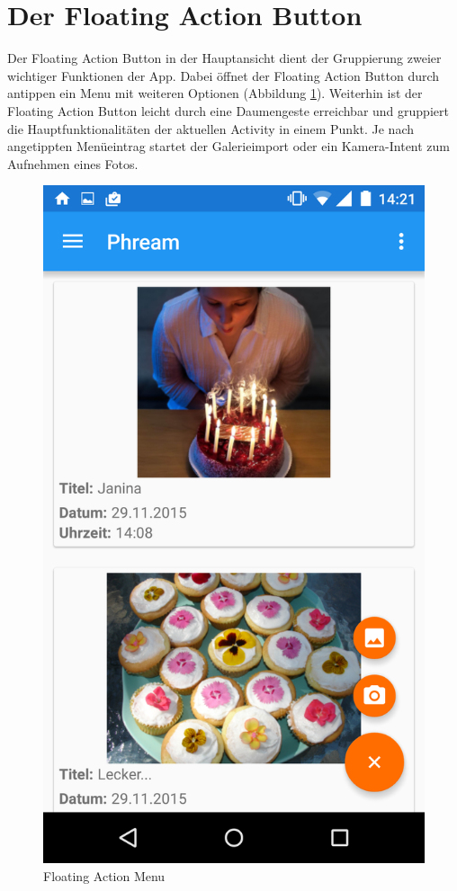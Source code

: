 \section{Der Floating Action Button}
Der Floating Action Button in der Hauptansicht dient der Gruppierung zweier wichtiger Funktionen der App. Dabei öffnet der Floating Action Button durch antippen ein Menu mit weiteren Optionen (Abbildung \ref{label:floatingaction_menu}). Weiterhin ist der Floating Action Button leicht durch eine Daumengeste erreichbar und gruppiert die Hauptfunktionalitäten der aktuellen Activity in einem Punkt. Je nach angetippten Menüeintrag startet der Galerieimport oder ein Kamera-Intent zum Aufnehmen eines Fotos.

\begin{figure}[H]
\centering
\includegraphics[scale=0.1]{images/screenshots/floatingaction_menu.png}
\caption{Floating Action Menu}
\label{label:floatingaction_menu}
\end{figure}

